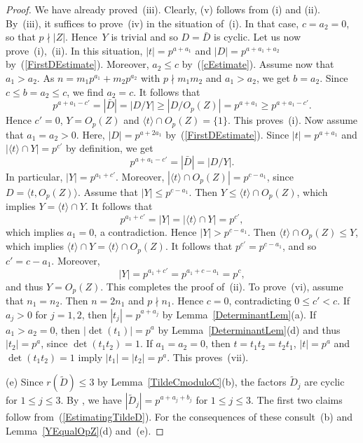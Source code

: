 \documentclass[12pt]{amsart}
\theoremstyle{theorem}
\theoremstyle{definition}
\theoremstyle{remark}
\begin{document}
\begin{proof}
We have already proved~(iii). Clearly, (v) follows from (i) and (ii). By~(iii), 
it suffices to prove~(iv) in the 
situation of~(i). In that case, $c = a_2 = 0$, so that $p \nmid |Z|$. Hence~$Y$ 
is trivial and so $D = \bar{D}$ is cyclic. Let us now prove~(i),~(ii).
In this situation, $|t| = p^{a+a_1}$ and $|D| = p^{a+a_1+a_2}$ 
by~(\ref{FirstDEstimate}). Moreover, $a_2 \leq c$ by~(\ref{cEstimate}).
Assume now that $a_1 > a_2$. As 
$n = m_1p^{a_1} + m_2p^{a_2}$ with $p \nmid m_1m_2$ and $a_1 > a_2$, we
get $b = a_2$. Since $c \leq b = a_2 \leq c$, we find $a_2 = c$.
It follows that
$$p^{a + a_1 - c'} = |\bar{D}| = |D/Y| \geq |D/O_p(Z)| = p^{a+a_1} 
\geq p^{a + a_1 - c'}.$$ 
Hence $c' = 0$, $Y = O_p(Z)$ and $\langle t \rangle \cap O_p( Z ) = \{ 1 \}$.
This proves~(i). Now assume that $a_1 = a_2 > 0$. Here, $|D| = p^{a+2a_1}$ 
by~(\ref{FirstDEstimate}). Since $|t| = p^{a+a_1}$ and 
$|\langle t \rangle \cap Y| = p^{c'}$ by definition, we get
$$p^{a + a_1 - c'} = |\bar{D}| = |D/Y|.$$ 
In particular, $|Y| = p^{a_1+c'}$. Moreover, 
$|\langle t \rangle \cap O_p( Z )| = p^{c-a_1}$, since 
$D = \langle t, O_p( Z ) \rangle$. Assume that 
$|Y| \leq p^{c-a_1}$. Then $Y \leq \langle t \rangle \cap O_p( Z )$, which 
implies $Y = \langle t \rangle \cap Y$. It follows that
$$p^{a_1 + c'} = |Y| = |\langle t \rangle \cap Y| = p^{c'},$$
which implies $a_1 = 0$, a contradiction. Hence $|Y| > p^{c-a_1}$. Then
$\langle t \rangle \cap O_p( Z ) \leq Y$, which implies 
$\langle t \rangle \cap Y = \langle t \rangle \cap O_p( Z )$. 
It follows
that $p^{c'} = p^{c - a_1}$, and so $c' = c -a_1$. Moreover,
$$|Y| = p^{a_1 + c'} = p^{a_1 + c - a_1} = p^c,$$
and thus $Y = O_p( Z )$. This completes the proof of~(ii).
To prove~(vi), assume that $n_1 = n_2$. Then $n = 2n_1$ and $p \nmid n_1$. Hence 
$c = 0$, contradicting $0 \leq c' < c$.
If $a_j > 0$ for $j = 1, 2$, then $|t_j| = p^{a+a_j}$ by 
Lemma~\ref{DeterminantLem}(a). If $a_1 > a_2 = 0$, then $|\det(t_1)| = p^a$ by 
Lemma~\ref{DeterminantLem}(d) and thus $|t_2| = p^a$, since $\det(t_1t_2) = 1$. 
If $a_1 = a_2 = 0$, then $t = t_1t_2 = t_2t_1$, $|t| = p^a$ and 
$\det(t_1t_2) = 1$ imply $|t_1| = |t_2| = p^a$. This proves~(vii).

(e) Since $r( \tilde{D} ) \leq 3$ by Lemma~\ref{TildeCmoduloC}(b), the factors
$\tilde{D}_j$ are cyclic for $1 \leq j \leq 3$. By 
\cite[Corollary~$3.6.2$]{HL25}, we have $|\tilde{D}_j| = p^{a + a_j + b_j}$ for 
$1 \leq j \leq 3$. The first two claims follow from~(\ref{EstimatingTildeD}).
For the consequences of these consult~(b) and Lemma~\ref{YEqualOpZ}(d) and~(e).


\end{proof}
\end{document}

